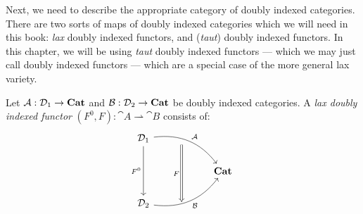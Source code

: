 \documentclass[DynamicalBook]{subfiles}
\begin{document}
Next, we need to describe the appropriate category of doubly indexed categories.
There are two sorts of maps of doubly indexed categories which we will need in
this book: \emph{lax} doubly indexed functors, and (\emph{taut}) doubly indexed
functors. In this chapter, we will be using \emph{taut} doubly indexed functors
--- which we may just call doubly indexed functors --- which are a special case
of the more general lax variety.


\begin{definition}\label{def.lax_doubly_indexed_functor}
  Let $\mathcal{A} : \mathcal{D}_1 \to \textbf{Cat}$ and $\mathcal{B} : \mathcal{D}_2 \to
  \textbf{Cat}$ be doubly indexed categories. A \emph{lax doubly indexed functor}
  $(F^0, F) : \cat{A} \rightharpoonup \cat{B}$ consists of:
  \[
\begin{tikzcd}
\cat{D}_1 \arrow[dd, "{F^0}"'] \arrow[rrd, "{ \cat{A} }", bend left] & {} \arrow[dd, "{F}"', Rightarrow] &      \\
  &   & \Cat{Cat} \\
\cat{D}_2 \arrow[rru, bend right, "{\cat{B}}"']      & {}   &     
\end{tikzcd}
  \]
  

\end{definition}
\end{document}
